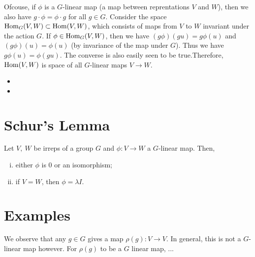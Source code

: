 \begin{enumerate}[(a)]
\begin{center}
        \end{center}
        Ofcouse, if $\phi$ is a $G$-linear map (a map between reprentations $V$ and $W$), then we also have $g\cdot\phi = \phi\cdot g$ for all $g\in G$. Consider the space $\operatorname{Hom}_G(V,W) \subset \operatorname{Hom}(V,W)$, which consists of maps from $V$ to $W$ invariant under the action $G$. If $\phi\in \operatorname{Hom}_G(V,W)$, then we have $(g\phi)(gu)=g\phi(u)$ and $(g\phi)(u)=\phi(u)$ (by invariance of the map under $G$). Thus we have $g\phi(u)=\phi(gu)$. The converse is also easily seen to be true.Therefore, $\operatorname{Hom}(V,W)$ is space of all $G$-linear maps $V\to W$.   

        
\end{enumerate}



\begin{itemize}
    \item {}
    \item {}
\end{itemize}

\section{Schur's Lemma}
\label{sec:schur_s_lemma}

\begin{lemma}
    Let $V,\ W$ be irreps of a group $G$ and $\phi: V\to W$ a $G$-linear map. Then,
    \begin{enumerate}[(i)]
        \item either $\phi$ is 0 or an isomorphism;
        \item if $V=W$, then $\phi=\lambda I$.
    \end{enumerate}
\end{lemma}

\section{Examples}
\label{sec:examples}

We observe that any $g\in G$ gives a map $\rho(g): V\to V$. In general, this is not a $G$-linear map however. For $\rho(g)$ to be a $G$ linear map, ...

